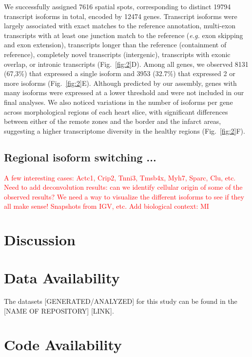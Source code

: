 \documentclass[utf8]{FrontiersinHarvard} %
\newcommand{\eg}{\textit{e.g.}\xspace}
\newcommand*{\red}{\textcolor{red}}
\begin{document}
We successfully assigned 7616 spatial spots, corresponding to distinct 19794 transcript isoforms in total, encoded by 12474 genes.
Transcript isoforms were largely associated with exact matches to the reference annotation, multi-exon transcripts with at least one junction match to the reference (\eg exon skipping and exon extension), transcripts longer than the reference (containment of reference), completely novel transcripts (intergenic), transcripts with exonic overlap, or intronic transcripts (Fig.~\ref{fig:2}D). 
Among all genes, we observed 8131 (67,3\%) that expressed a single isoform and 3953 (32.7\%) that expressed 2 or more isoforms (Fig.~\ref{fig:2}E).
Although predicted by our assembly, genes with many isoforms were expressed at a lower threshold and were not included in our final analyses.
We also noticed variations in the number of isoforms per gene across morphological regions of each heart slice, with significant differences between either of the remote zones and the border and the infarct areas, suggesting a higher transcriptome diversity in the healthy regions (Fig.~\ref{fig:2}F). 

\subsection{Regional isoform switching ... }

\red{A few interesting cases: Actc1, Crip2, Tnni3, Tmsb4x, Myh7, Sparc, Clu, etc.}
\red{Need to add deconvolution results: can we identify cellular origin of some of the observed results?}
\red{We need a way to visualize the different isoforms to see if they all make sense! Snapshots from IGV, etc.}
\red{Add biological context: MI}


\section*{Discussion}


\section*{Data Availability}
The datasets [GENERATED/ANALYZED] for this study can be found in the [NAME OF REPOSITORY] [LINK].

\section*{Code Availability}
\end{document}
